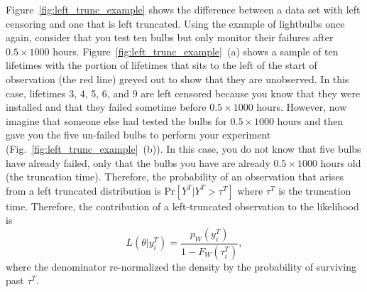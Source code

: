 Figure~\ref{fig:left_trunc_example} shows the difference between a data set with left censoring and one that is left truncated. Using the example of lightbulbs once again, consider that you test ten bulbs but only monitor their failures after $0.5 \times 1000$ hours. Figure~\ref{fig:left_trunc_example}~(a) shows a sample of ten lifetimes with the portion of lifetimes that sits to the left of the start of observation (the red line) greyed out to show that they are unobserved. In this case, lifetimes 3, 4, 5, 6, and 9 are left censored because you know that they were installed and that they failed sometime before $0.5 \times 1000$ hours. However, now imagine that someone else had tested the bulbs for $0.5 \times 1000$ hours and then gave you the five un-failed bulbs to perform your experiment (Fig.~\ref{fig:left_trunc_example}~(b)). In this case, you do not know that five bulbs have already failed, only that the bulbs you have are already $0.5 \times 1000$ hours old (the truncation time). Therefore, the probability of an observation that arises from a left truncated distribution is $\text{Pr}\left[Y^T|Y^T > \tau^T\right]$ where $\tau^T$ is the truncation time. Therefore, the contribution of a left-truncated observation to the likelihood is
\begin{equation}
    \label{eq:left_trunc}
    L\left(\theta|y^T_i\right) = \frac{p_W\left(y^T_i\right)}{1 - F_W\left(\tau^{T}_i\right)},
\end{equation}
where the denominator re-normalized the density by the probability of surviving past $\tau^T$.



